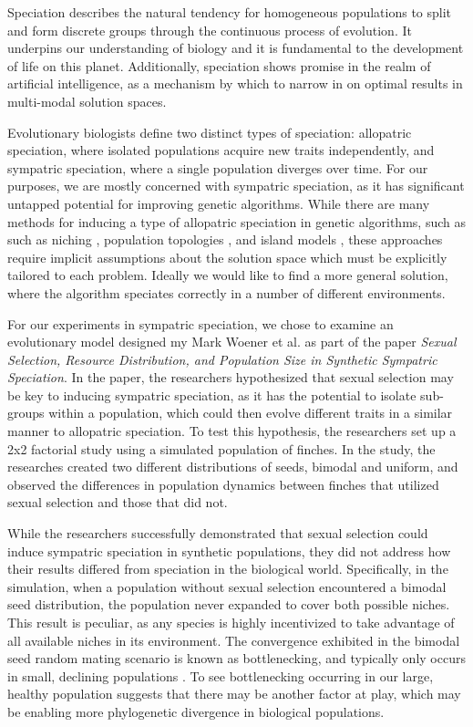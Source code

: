 \documentclass{article}
\begin{document}
Speciation describes the natural tendency for homogeneous populations to split and form discrete groups through the continuous process of evolution. \cite{SPBOOK} It underpins our understanding of biology and it is fundamental to the development of life on this planet. Additionally, speciation shows promise in the realm of artificial intelligence, as a mechanism by which to narrow in on optimal results in multi-modal solution spaces.

Evolutionary biologists define two distinct types of speciation: allopatric speciation, where isolated populations acquire new traits independently, and sympatric speciation, where a single population diverges over time. For our purposes, we are mostly concerned with sympatric speciation, as it has significant untapped potential for improving genetic algorithms. While there are many methods for inducing a type of allopatric speciation in genetic algorithms, such as such as niching \cite{NICHING}, population topologies \cite{TOPOLOGIES}, and island models \cite{ISLAND}, these approaches require implicit assumptions about the solution space which must be explicitly tailored to each problem. Ideally we would like to find a more general solution, where the algorithm speciates correctly in a number of different environments. 

For our experiments in sympatric speciation, we chose to examine an evolutionary model designed my Mark Woener et al. as part of the paper \textit{Sexual Selection, Resource Distribution, and Population Size in Synthetic Sympatric Speciation}. In the paper, the researchers hypothesized that sexual selection may be key to inducing sympatric speciation, as it has the potential to isolate sub-groups within a population, which could then evolve different traits in a similar manner to allopatric speciation. To test this hypothesis, the researchers set up a 2x2 factorial study using a simulated population of finches. In the study, the researches created two different distributions of seeds, bimodal and uniform, and observed the differences in population dynamics between finches that utilized sexual selection and those that did not.

While the researchers successfully demonstrated that sexual selection could induce sympatric speciation in synthetic populations, they did not address how their results differed from speciation in the biological world. Specifically, in the simulation, when a population without sexual selection encountered a bimodal seed distribution, the population never expanded to cover both possible niches. This result is peculiar, as any species is highly incentivized to take advantage of all available niches in its environment. The convergence exhibited in the bimodal seed random mating scenario is known as bottlenecking, and typically only occurs in small, declining populations \cite{CHICKEN}. To see bottlenecking occurring in our large, healthy population suggests that there may be another factor at play, which may be enabling more phylogenetic divergence in biological populations.
\end{document}
